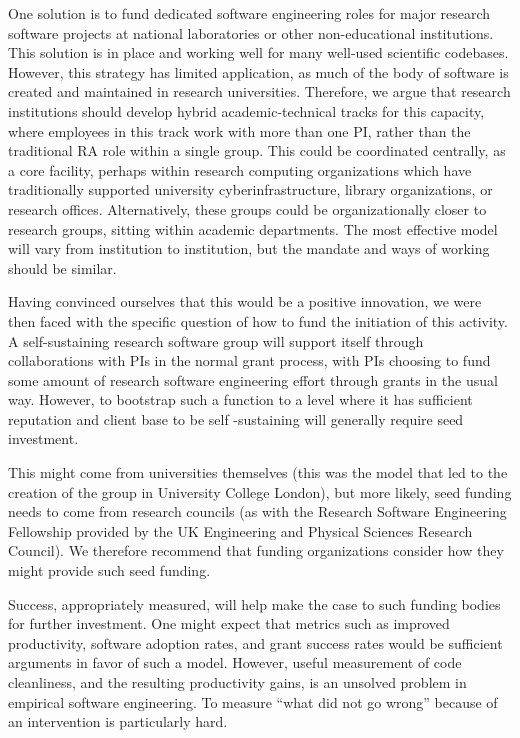 One solution is to fund dedicated software engineering roles for major research software projects at national laboratories
or other non-educational institutions. This solution is in place and working well for many well-used scientific codebases.
However, this strategy has limited application, as much of the body of software is created and maintained in research
universities. Therefore, we argue that research institutions should develop hybrid academic-technical tracks for this
capacity, where employees in this track work with more than one PI, rather than the traditional RA role within a single group.
This could be coordinated centrally, as a core facility, perhaps within research computing organizations which have
traditionally supported university cyberinfrastructure, library organizations, or research offices. Alternatively, these
groups could be organizationally closer to research groups, sitting within academic departments. The most effective model
will vary from institution to institution, but the mandate and ways of working should be similar.

Having convinced ourselves that this would be a positive innovation, we were then faced with the specific question of how to
fund the initiation of this activity. A self-sustaining research software group will support itself through collaborations
with PIs in the normal grant process, with PIs choosing to fund some amount of research software engineering effort through grants in
the usual way. However, to bootstrap such a function to a level where it has sufficient reputation and client base to be self
-sustaining will generally require seed investment.

This might come from universities themselves (this was the model that led to the creation of the group in University College
London), but more likely, seed funding needs to come from research councils (as with the Research Software
Engineering Fellowship provided by the UK Engineering and Physical Sciences Research Council). We therefore recommend that
funding organizations consider how they might provide such seed funding.

Success, appropriately measured, will help make the case to such funding bodies for further investment. One might expect that metrics such as improved productivity, software adoption rates, and grant success rates would be sufficient arguments in favor of such a model. However, useful measurement of code cleanliness, and the resulting productivity gains, is an unsolved problem in empirical software engineering. To measure ``what did not go wrong'' because of an intervention is particularly hard. 

